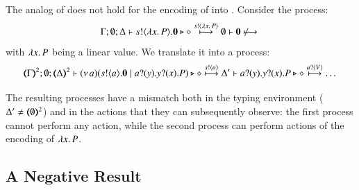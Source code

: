 \documentclass[runningheads]{llncs}
\begin{document}
{\begin{proposition}
\begin{enumerate}[1.]
	\end{enumerate}
\end{proposition}

The analog of  does not hold for the encoding of \HOp into \sessp.
Consider the \HOp process:
\[
	\Gamma; \es; \Delta \proves \bout{s}{\abs{x}{P}} \inact \hastype \Proc \hby{\bactout{s}{\abs{x} P}} \es \proves \inact \not \hby{}
\]
with $\lambda x.\,P$ being a linear value.
We translate it into a \sessp process:
\[\tmap{\Gamma}{2}; \es; \tmap{\Delta}{2} \proves \newsp{a}{\bout{s}{a} \inact \Par \binp{a}{y} \binp{y}{x} P} \hastype \Proc
	 \hby{\bactout{s}{a}} \Delta' \proves \binp{a}{y} \binp{y}{x} P \hastype \Proc
\hby{\bactinp{a}{V}} \dots
\]


The resulting processes have a mismatch both in the typing
environment ($\Delta' \not= (\!\!\langle\emptyset\rangle\!\!)^{2}$)
and in the actions that they can %
subsequently observe: the first process
cannot perform any action, while the second process
can perform actions of the encoding of $\lambda x.\,P$.



\subsection{A Negative Result}
\label{ss:negative}
%

}
\end{document}

